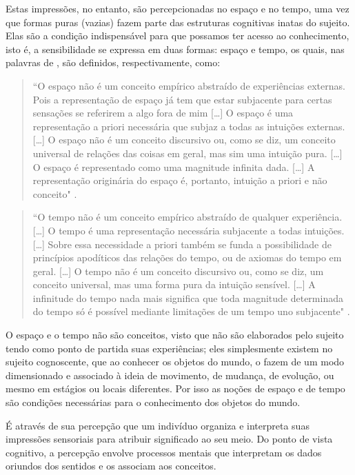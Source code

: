 Estas impressões, no entanto, são percepcionadas no espaço e no tempo, uma vez que formas puras (vazias) fazem parte das estruturas cognitivas inatas do sujeito. Elas são a condição indispensável para que possamos ter acesso ao conhecimento, isto é, a sensibilidade se expressa em duas formas: espaço e tempo, os  quais, nas palavras de \citet{kant:1983.critica}, são definidos, respectivamente, como:

\begin{quote}
``O espaço não é um conceito empírico abstraído de experiências externas. Pois a representação de espaço já tem que estar subjacente para certas sensações se referirem a algo fora de mim […] O espaço é uma representação a priori necessária que subjaz a todas as intuições externas. […] O espaço não é um conceito discursivo ou, como se diz, um conceito universal de relações das coisas em geral, mas sim uma intuição pura. […] O espaço é representado como uma magnitude infinita dada. […] A representação originária do espaço é, portanto, intuição a priori e não conceito" \citep[p.41]{kant:1983.critica}.
\end{quote}

\begin{quote}
``O tempo não é um conceito empírico abstraído de qualquer experiência. […] O tempo é uma representação necessária subjacente a todas intuições. […] Sobre essa necessidade a priori também se funda a possibilidade de princípios apodíticos das relações do tempo, ou de axiomas do tempo em geral. […] O tempo não é um conceito discursivo ou, como se diz, um conceito universal, mas uma forma pura da intuição sensível. […] A infinitude do tempo nada mais significa que toda magnitude determinada do tempo só é possível mediante limitações de um tempo uno subjacente" \citep[p.44--45]{kant:1983.critica}. 
\end{quote}

O espaço e o tempo não são conceitos, visto que não são elaborados pelo sujeito tendo como ponto de partida suas experiências; eles simplesmente existem no sujeito cognoscente, que ao conhecer os objetos do mundo, o fazem de um modo dimensionado e associado à ideia de movimento, de mudança, de evolução, ou mesmo em estágios ou locais diferentes. Por isso as noções de espaço e de tempo são condições necessárias para o conhecimento dos objetos do mundo.

É através de sua percepção que um indivíduo organiza e interpreta suas impressões sensoriais para atribuir significado ao seu meio. Do ponto de vista cognitivo, a percepção envolve processos mentais que interpretam os dados oriundos dos sentidos e os associam aos conceitos.

